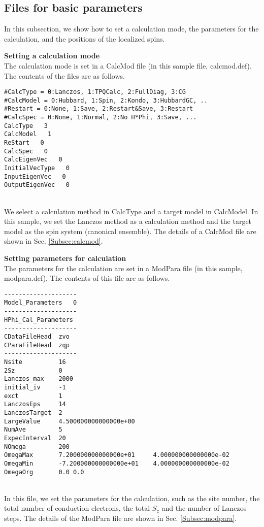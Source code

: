 \subsection{Files for basic parameters}
In this subsection, we show how to set a calculation mode,
the parameters for the calculation, and the positions of the localized spins.
\begin{description}
\item {\bf Setting a calculation mode}\\
  The calculation mode is set in a CalcMod file (in this sample file, calcmod.def).
  The contents of the files are as follows.\\
\begin{minipage}{15cm}
\begin{screen}
\begin{verbatim}
#CalcType = 0:Lanczos, 1:TPQCalc, 2:FullDiag, 3:CG
#CalcModel = 0:Hubbard, 1:Spin, 2:Kondo, 3:HubbardGC, ..
#Restart = 0:None, 1:Save, 2:Restart&Save, 3:Restart
#CalcSpec = 0:None, 1:Normal, 2:No H*Phi, 3:Save, ...
CalcType   3
CalcModel   1
ReStart   0
CalcSpec   0
CalcEigenVec   0
InitialVecType   0
InputEigenVec   0
OutputEigenVec   0
\end{verbatim}
\end{screen}
\end{minipage}
~\\
We select a calculation method in CalcType and a target model in CalcModel.
In this sample, we set the Lanczos method as a calculation method
and the target model as the spin system (canonical ensemble).
The details of a CalcMod file are shown in Sec. \ref{Subsec:calcmod}.\\

\item {\bf Setting parameters for calculation}\\
  The parameters for the calculation are set in a ModPara file
  (in this sample, modpara.def).
  The contents of this file are as follows.\\
\begin{minipage}{15cm}
\begin{screen}
\begin{verbatim}
--------------------
Model_Parameters   0
--------------------
HPhi_Cal_Parameters
--------------------
CDataFileHead  zvo
CParaFileHead  zqp
--------------------
Nsite          16   
2Sz            0    
Lanczos_max    2000 
initial_iv     -1   
exct           1    
LanczosEps     14   
LanczosTarget  2    
LargeValue     4.500000000000000e+00    
NumAve         5    
ExpecInterval  20   
NOmega         200  
OmegaMax       7.200000000000000e+01     4.000000000000000e-02    
OmegaMin       -7.200000000000000e+01    4.000000000000000e-02    
OmegaOrg       0.0 0.0
\end{verbatim}
\end{screen}
\end{minipage}
~\\
In this file, we set the parameters for the calculation, such as the site number,
the total number of conduction electrons, the total $S_z$ and the number of Lanczos steps.
The details of the ModPara file are shown in Sec. \ref{Subsec:modpara}.\\


\end{description}
